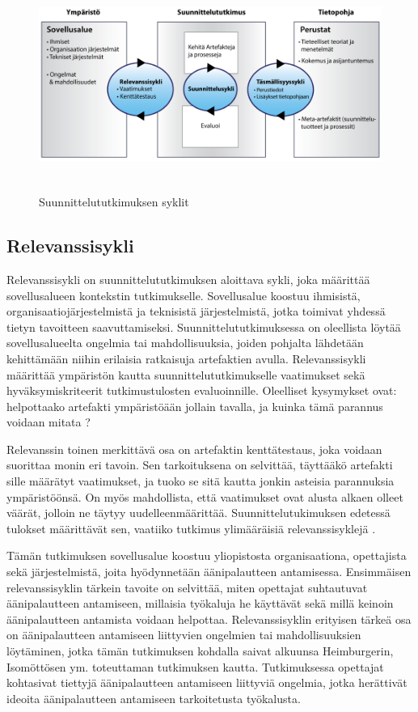 \documentclass[utf8]{gradu3}
\begin{document}
\begin{figure}[h]\centering
  \includegraphics[height=7cm,keepaspectratio]{DSR}
  \caption[]{Suunnittelututkimuksen syklit}
  \label{fig:dsr}
\end{figure}

\subsection{Relevanssisykli}

Relevanssisykli on suunnittelututkimuksen aloittava sykli, joka määrittää sovellusalueen kontekstin tutkimukselle. Sovellusalue koostuu ihmisistä, organisaatiojärjestelmistä ja teknisistä järjestelmistä, jotka toimivat yhdessä tietyn tavoitteen saavuttamiseksi. Suunnittelututkimuksessa on oleellista löytää sovellusalueelta ongelmia tai mahdollisuuksia, joiden pohjalta lähdetään kehittämään niihin erilaisia ratkaisuja artefaktien avulla. Relevanssisykli määrittää ympäristön kautta suunnittelututkimukselle vaatimukset sekä hyväksymiskriteerit tutkimustulosten evaluoinnille. Oleelliset kysymykset ovat: helpottaako artefakti ympäristöään jollain tavalla, ja kuinka tämä parannus voidaan mitata \parencite[][]{cycles}?

Relevanssin toinen merkittävä osa on artefaktin kenttätestaus, joka voidaan suorittaa monin eri tavoin. Sen tarkoituksena on selvittää, täyttääkö artefakti sille määrätyt vaatimukset, ja tuoko se sitä kautta jonkin asteisia parannuksia ympäristöönsä. On myös mahdollista, että vaatimukset ovat alusta alkaen olleet väärät, jolloin ne täytyy uudelleenmäärittää. Suunnittelutukimuksen edetessä tulokset määrittävät sen, vaatiiko tutkimus ylimääräisiä relevanssisyklejä \parencite[][]{cycles}.

Tämän tutkimuksen sovellusalue koostuu yliopistosta organisaationa, opettajista sekä järjestelmistä, joita hyödynnetään äänipalautteen antamisessa. Ensimmäisen relevanssisyklin tärkein tavoite on selvittää, miten opettajat suhtautuvat äänipalautteen antamiseen, millaisia työkaluja he käyttävät sekä millä keinoin äänipalautteen antamista voidaan helpottaa. Relevanssisyklin erityisen tärkeä osa on äänipalautteen antamiseen liittyvien ongelmien tai mahdollisuuksien löytäminen, jotka tämän tutkimuksen kohdalla saivat alkuunsa Heimburgerin, Isomöttösen ym. \parencite*[][]{academics} toteuttaman tutkimuksen kautta. Tutkimuksessa opettajat kohtasivat tiettyjä äänipalautteen antamiseen liittyviä ongelmia, jotka herättivät ideoita äänipalautteen antamiseen tarkoitetusta työkalusta.
\end{document}
